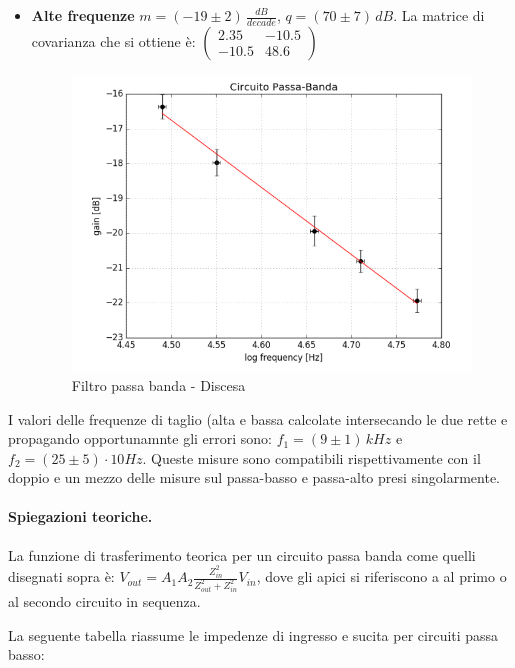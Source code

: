 \documentclass[10pt,a4paper]{article}
\begin{document}
\begin{itemize}
\item \textbf{Alte frequenze}
$m = (-19 \pm 2) \, \frac{dB}{decade}$, $q = (70 \pm 7) \, dB$. La matrice di covarianza che si ottiene è:
$\left(\begin{array}{cc}
2.35 & -10.5 \\ 
-10.5 & 48.6
\end{array}\right)$

\begin{figure}[h]
\centering
\includegraphics[scale=0.4]{immagine9.png}
\caption{Filtro passa banda - Discesa}
\end{figure}

\end{itemize} 

I valori delle frequenze di taglio (alta e bassa calcolate intersecando le due rette e propagando opportunamnte gli errori sono: 
$f_1 = (9\pm1) \, kHz$ e $f_2 = (25 \pm 5) \cdot 10 Hz$. Queste misure sono compatibili rispettivamente con il doppio e un mezzo delle misure sul passa-basso e passa-alto presi singolarmente.


\paragraph{Spiegazioni teoriche.}
La funzione di trasferimento teorica per un circuito passa banda come quelli disegnati sopra è: 
$V_{out} = A_{1} A_{2} \frac{Z_{in}^2}{Z_{out}^2+Z_{in}^2} V_{in}$, dove gli apici si riferiscono a al primo o al secondo circuito in sequenza. 

La seguente tabella riassume le impedenze di ingresso e sucita per circuiti passa basso:
\end{document}
